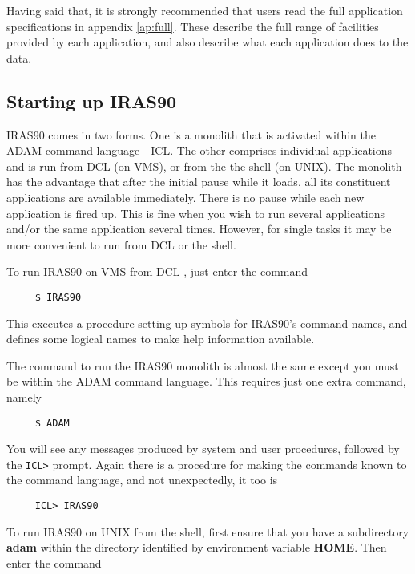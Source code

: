 Having said that, it is strongly recommended that users read the full
application specifications in appendix \ref{ap:full}. These describe the full
range of facilities provided by each application, and also describe what each
application does to the data. 

\subsection{Starting up IRAS90}
{\small IRAS90} comes in two forms.  One is a monolith that is activated within
the {\small ADAM} command language---{\small ICL}.  The other comprises
individual applications and is run from {\small DCL} (on {\small VMS}), or from
the the shell (on {\small UNIX}).  The monolith has the advantage that after the
initial pause while it loads, all its constituent applications are available
immediately.  There is no pause while each new application is fired up.  This is
fine when you wish to run several applications and/or the same application
several times. However, for single tasks it may be more convenient to run from
{\small DCL} or the shell. 

To run {\small IRAS90} on {\small VMS} from {\small DCL} , just enter the
command

\small
\begin{verbatim}
     $ IRAS90
\end{verbatim}
\normalsize

This executes a procedure setting up symbols for {\small IRAS90}'s command
names, and defines some logical names to make help information available.

The command to run the {\small IRAS90} monolith is almost the same except you
must be within the {\small ADAM} command language.  This requires just one extra
command, namely 

\small
\begin{verbatim}
     $ ADAM
\end{verbatim}
\normalsize

You will see any messages produced by system and user procedures, followed
by the {\tt ICL>} prompt. Again there is a procedure for making the
commands known to the command language, and not unexpectedly, it too is

\small
\begin{verbatim}
     ICL> IRAS90
\end{verbatim}
\normalsize

To run {\small IRAS90} on {\small UNIX} from the shell, first ensure that you
have a subdirectory {\bf adam} within the directory identified by environment 
variable {\bf HOME}. Then enter the command

